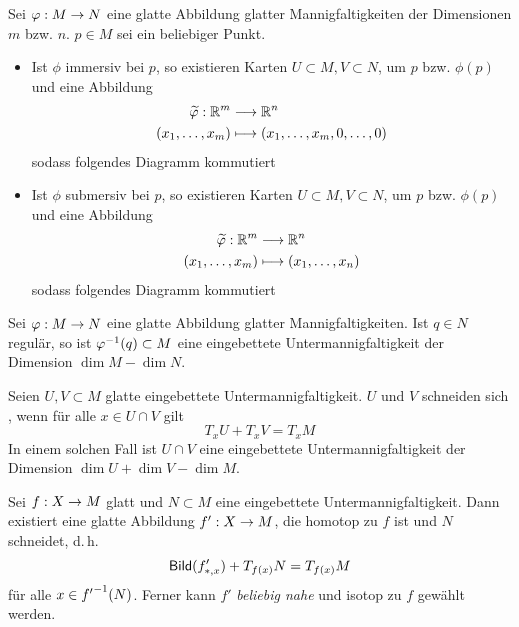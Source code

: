 \Prop{}
Sei $\varphi : M \overset{}{\rightarrow} N$ eine glatte Abbildung glatter Mannigfaltigkeiten der Dimensionen $m$ bzw. $n$. $p\in M$ sei ein beliebiger Punkt.
\begin{itemize}
	\item Ist $\phi$ immersiv bei $p$, so existieren Karten $U\subset M, V\subset N$, um $p$ bzw. $\phi(p)$ und eine Abbildung
	\begin{align*}
	\widetilde{\varphi} : \mathbb{R}^m& \overset{}{\longrightarrow} \mathbb{R}^n\\
	(x_1,\ldots, x_m) & \longmapsto (x_1,\ldots, x_m, 0,\ldots, 0)
	\end{align*}
	sodass folgendes Diagramm kommutiert
	\begin{center}
	\end{center}
	\item Ist $\phi$ submersiv bei $p$, so existieren Karten $U\subset M, V\subset N$, um $p$ bzw. $\phi(p)$ und eine Abbildung
\begin{align*}
\widetilde{\varphi} : \mathbb{R}^m& \overset{}{\longrightarrow} \mathbb{R}^n\\
(x_1,\ldots, x_m) & \longmapsto (x_1,\ldots, x_n)
\end{align*}
sodass folgendes Diagramm kommutiert
\begin{center}
\end{center}
\end{itemize}

\Kor{}
Sei $\varphi : M\overset{}{\rightarrow} N$ eine glatte Abbildung glatter Mannigfaltigkeiten. Ist $q\in N$ regulär, so ist $\varphi^{-1}(q)\subset M$ eine eingebettete Untermannigfaltigkeit der Dimension $\dim M - \dim N$.

\Satz{}
Seien $U,V \subset M$ glatte eingebettete Untermannigfaltigkeit. $U$ und $V$ schneiden sich , wenn für alle $x\in U\cap V$ gilt
\[ T_xU +T_xV = T_xM \]
In einem solchen Fall ist $U\cap V$ eine eingebettete Untermannigfaltigkeit der Dimension $\dim U + \dim V - \dim M$.

Sei $f : X \overset{}{\rightarrow} M$ glatt und $N\subset M$ eine eingebettete Untermannigfaltigkeit. Dann existiert eine glatte Abbildung $f' : X \overset{}{\rightarrow} M$, die homotop zu $f$ ist und $N$  schneidet, d.\,h.
\[ \textsf{Bild} (f'_{*,x})  + T_{f(x)}N = T_{f(x)}M \]
für alle $x \in {f'}^{-1}(N)$. Ferner kann $f'$ \textsl{beliebig nahe} und isotop zu $f$ gewählt werden.

